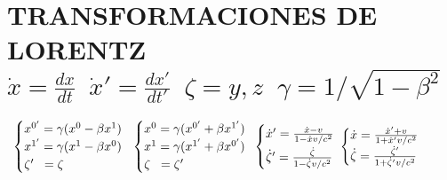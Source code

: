 \section{TRANSFORMACIONES DE LORENTZ $\dot{x}\!=\!\tfrac{dx}{dt}\; \; \dot{x}'\!=\!\tfrac{dx'}{dt'} \;\;\zeta \!=\!y,z\;\; \gamma = 1/{\sqrt{1 -\beta^2}}$} 
\begin{align*}
\hspace{-15pt}
&\begin{cases} 
x^{0'} =\gamma (x^0 -\beta x^1)
\\
x^{1'}=\gamma (x^1-\beta x^0)
\\
\zeta' \; \; = \zeta
\end{cases}
\hspace{-12pt}
&\begin{cases} 
x^{0} =\gamma (x^{0'} +\beta x^{1'})
\\
x^{1}=\gamma (x^{1'}+\beta x^{0'})
\\
\zeta \;\;= \zeta'
\end{cases}
\hspace{-5pt}
&\begin{cases} 
\dot{x}' =\tfrac{\dot{x}-v}{1-\dot{x}v/c^2 }
\vspace{3pt} \\
\dot{\zeta}' =\tfrac{\dot{\zeta}}{1-\dot{\zeta} v/c^2}
\end{cases}\hspace{-16pt}
&\begin{cases} 
\dot{x} =\tfrac{\dot{x}'+v}{1+\dot{x}' v/c^2 }
\vspace{1pt} \\
\dot{\zeta} =\tfrac{\dot{\zeta}'}{1+\dot{\zeta}' v/c^2}
\end{cases}
\end{align*}
\vspace{-1pt}
